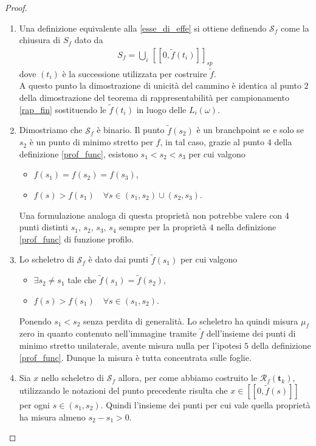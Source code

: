 \documentclass[11pt, twoside]{report}
\newcommand{\Ss}{\mathscr{S}}
\newcommand{\Rr}{\mathscr{R}}
\theoremstyle{definition}
\theoremstyle{plain}
\theoremstyle{remark}
\numberwithin{equation}{chapter}
\begin{document}
\begin{proof}
\begin{enumerate}
\item Una definizione equivalente alla \eqref{esse_di_effe} si ottiene definendo $\Ss_f$ come la chiusura di $S_f$ dato da
\begin{gather}
S_f=\bigcup\limits_i \, [[0, \tilde{f}(t_i)]]_{sp}
\end{gather}
dove $(t_i)$ è la successione utilizzata per costruire $\tilde{f}$.\\
A questo punto la dimostrazione di unicità del cammino è identica al punto $2$ della dimostrazione del teorema di rappresentabilità per campionamento \ref{rap_fin} sostituendo le $\tilde{f}(t_i)$ in luogo delle $L_i(\omega)$.

\item Dimostriamo che $\Ss_f$ è binario. Il punto $\tilde{f}(s_2)$ è un branchpoint se e solo se $s_2$ è un punto di minimo stretto per $f$, in tal caso, grazie al punto $4$ della definizione \ref{prof_func}, esistono $s_1<s_2<s_3$ per cui valgono
\begin{itemize}
\item $f(s_1)=f(s_2)=f(s_3)$,

\item $f(s)>f(s_1) \quad \forall s\in (s_1,s_2) \cup (s_2,s_3)$.
\end{itemize} 
Una formulazione analoga di questa proprietà non potrebbe valere con 4 punti distinti $s_1, \, s_2, \, s_3, \, s_4$  sempre per la proprietà $4$ nella definizione \ref{prof_func} di funzione profilo.

\item Lo scheletro di $\Ss_f$ è dato dai punti $\tilde{f}(s_1) $ per cui valgono 
\begin{itemize}
\item $\exists s_2\neq s_1$ tale che $\tilde{f}(s_1)=\tilde{f}(s_2)$,

\item $f(s)>f(s_1) \quad \forall s\in (s_1,s_2)$.
\end{itemize}
Ponendo $s_1<s_2$ senza perdita di generalità. Lo scheletro ha quindi misura $\mu_f$ zero in quanto contenuto nell'immagine tramite $\tilde{f}$ dell'insieme dei punti di minimo stretto unilaterale, avente misura nulla per l'ipotesi $5$ della definizione \ref{prof_func}. Dunque la misura è tutta concentrata sulle foglie.

\item Sia $x$ nello scheletro di $\Ss_f$ allora, per come abbiamo costruito le $\Rr_f(\mathbf{t}_k)$, utilizzando le notazioni del punto precedente risulta che $x\in [[0, \tilde{f}(s)]]$ per ogni $s \in (s_1 ,s_2)$. Quindi l'insieme dei punti per cui vale quella proprietà ha misura almeno $s_2-s_1>0$.
\end{enumerate}
\end{proof}
\end{document}
